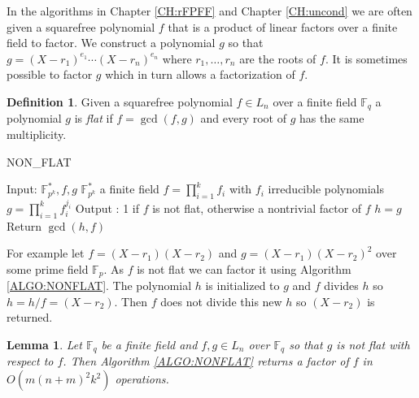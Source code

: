\documentclass{article}
\newcounter{dummy} \numberwithin{dummy}{section}
\theoremstyle{plain}
\newtheorem{lem}[dummy]{Lemma}
\theoremstyle{definition}
\newtheorem{mydef}[dummy]{Definition}
\def\Fp {{ \mathbb{F} _ {p} }}
\def\Fq {{ \mathbb{F} _ {q} }}
\def\FPE {{ \mathbb{F}^* _ {p^k} }}
\begin{document}
		In the algorithms in Chapter \ref{CH:rFPFF} and Chapter \ref{CH:uncond} we are often given a squarefree polynomial $f$ that is a product of linear factors over a finite field to factor. We construct a polynomial $g$ so that $g=(X-r_1)^{e_1} \cdots (X-r_n)^{e_n}$ where $r_1,\ldots,r_n$ are the roots of $f$. It is sometimes possible to factor $g$ which in turn allows a factorization of $f$.
			
		\begin{mydef}
		\label{DEF:flat}
		    Given a squarefree polynomial $f \in L_n$ over a finite field $\Fq$ a polynomial $g$ is \emph{flat} if $f=\gcd(f,g)$ and every root of $g$ has the same multiplicity.
		\end{mydef}
		
		\begin{singlespace}
		\begin{algorithm}[H] 
		\DontPrintSemicolon
		\label{ALGO:NONFLAT}
		\caption{NON\_FLAT}
		    Input: $\FPE,f,g$ \;
				\hspace{2mm} $\FPE$ a finite field \;
				\hspace{2mm} $f=\prod_{i=1}^k{f_i}$ with $f_i$ irreducible polynomials \;
				\hspace{2mm} $g=\prod_{i=1}^k{f_i^{j_i}}$ \;
				Output : 1 if $f$ is not flat, otherwise a nontrivial factor of $f$ \;
				\;
		    $h=g$ \;
		    Return $\gcd(h,f)$
		\end{algorithm}
		\end{singlespace}
	  \vspace{5mm}		
		
		For example let $f=(X-r_1)(X-r_2)$ and $g=(X-r_1)(X-r_2)^2$ over some prime field $\Fp$. As $f$ is not flat we can factor it using Algorithm \ref{ALGO:NONFLAT}. The polynomial $h$ is initialized to $g$ and $f$ divides $h$ so $h=h/f=(X-r_2)$. Then $f$ does not divide this new $h$ so $(X-r_2)$ is returned. 
		
		\begin{lem}
		\label{THM:NONFLATTime}
		    Let $\Fq$ be a finite field and $f,g \in L_n$ over $\Fq$ so that $g$ is not flat with respect to $f$. Then Algorithm \ref{ALGO:NONFLAT} returns a factor of $f$ in $O( m(n+m)^2 k^2)$ operations. 
		\end{lem}
		
\end{document}
